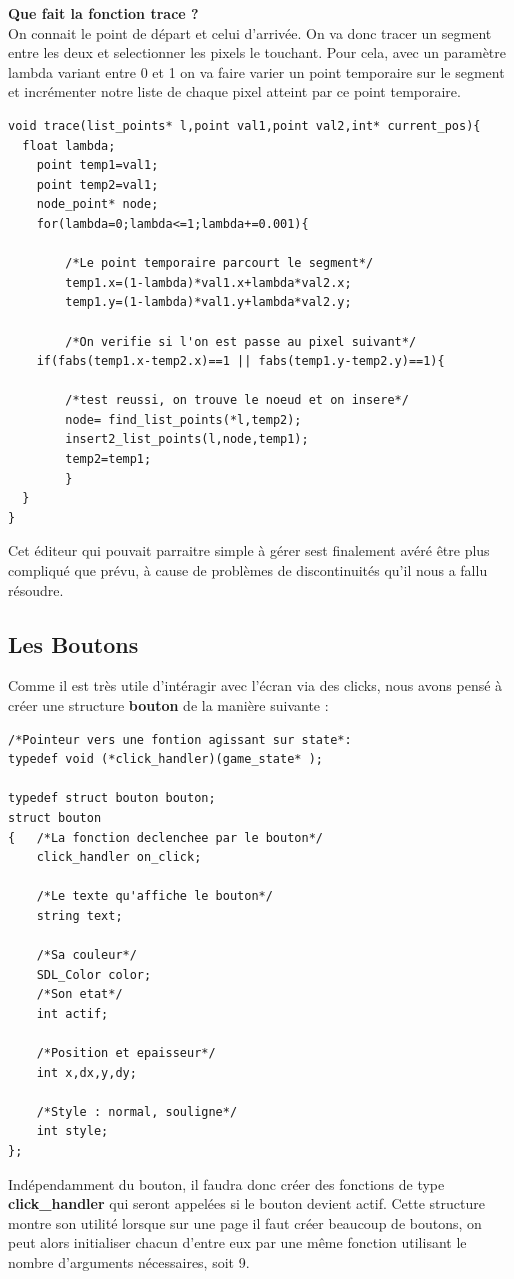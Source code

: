 \textbf{Que fait la fonction trace ?}
~\\
On connait le point de départ et celui d'arrivée. On va donc tracer un segment entre les deux et selectionner les pixels le touchant.
Pour cela, avec un paramètre lambda variant entre 0 et 1 on va faire varier un point temporaire sur le segment et incrémenter notre liste de chaque pixel atteint par ce point temporaire.
~\\
\begin{lstlisting}
void trace(list_points* l,point val1,point val2,int* current_pos){ 
  float lambda;
	point temp1=val1;
	point temp2=val1;
	node_point* node;
	for(lambda=0;lambda<=1;lambda+=0.001){

		/*Le point temporaire parcourt le segment*/
		temp1.x=(1-lambda)*val1.x+lambda*val2.x;
		temp1.y=(1-lambda)*val1.y+lambda*val2.y;

		/*On verifie si l'on est passe au pixel suivant*/
    if(fabs(temp1.x-temp2.x)==1 || fabs(temp1.y-temp2.y)==1){

		/*test reussi, on trouve le noeud et on insere*/
		node= find_list_points(*l,temp2);
		insert2_list_points(l,node,temp1);
		temp2=temp1;
		}
  } 
}  
\end{lstlisting}

Cet éditeur qui pouvait parraitre simple à gérer sest finalement avéré être plus compliqué que prévu, à cause de problèmes de discontinuités qu'il nous a fallu résoudre.
\subsection{Les Boutons}
Comme il est très utile d'intéragir avec l'écran via des clicks, nous avons pensé à créer une structure \textbf{bouton} de la manière suivante :
\begin{lstlisting}
/*Pointeur vers une fontion agissant sur state*:
typedef void (*click_handler)(game_state* );

typedef struct bouton bouton;
struct bouton
{	/*La fonction declenchee par le bouton*/
	click_handler on_click;

	/*Le texte qu'affiche le bouton*/
	string text;

	/*Sa couleur*/
	SDL_Color color;
	/*Son etat*/
	int actif;

	/*Position et epaisseur*/
	int x,dx,y,dy;

	/*Style : normal, souligne*/
	int style; 
};
\end{lstlisting}
Indépendamment du bouton, il faudra donc créer des fonctions de type \textbf{click_handler} qui seront appelées si le bouton devient actif.
Cette structure montre son utilité lorsque sur une page il faut créer beaucoup de boutons, on peut alors initialiser chacun d'entre eux par une même fonction utilisant le nombre d'arguments nécessaires, soit 9.
